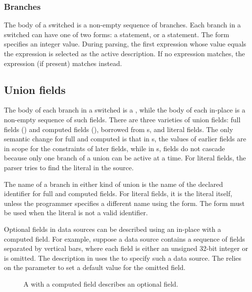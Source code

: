 \subsubsection{Branches}
The body of a switched \Punion{} is a non-empty sequence of branches.
Each branch in a switched \Punion{} can have one of two forms: a
\Pcase{} statement, or a \Pdefault{} statement.  The \Pcase{} form
specifies an integer value.  During parsing, the first \Pcase{}
expression whose value equals the \Pswitch{} expression is selected as
the active description. If no \Pcase{} expression
matches, the \Pdefault{} expression (if present) matches instead.

\subsection{Union fields}
The body of each branch in a switched \Punion{} is a ,
while the body of each in-place \Punion{} is a non-empty sequence of
such fields. 
There are three varieties of union fields: 
full fields () 
and computed fields (), borrowed from \Pstruct{}s, and 
literal fields.
The only semantic change for full and computed is that in \Pstruct{}s,
the values of earlier 
fields are in scope for the constraints of later fields, while in
\Punion{}s, fields do not cascade because only one branch of a union
can be active at a time.  For literal fields, the parser tries to find
the literal in the source.  

The name of a branch in either kind of union is the name of the
declared identifier for full and computed fields.  For literal fields,
it is the literal itself, unless the programmer specifies a different
name using the \Pfrom{} form.  The \Pfrom{} form must be used when the
literal is not a valid \C{} identifier.


Optional fields in data sources can be described using an in-place
\Punion{} with a computed field.  For example, suppose a data source
contains a sequence of fields separated by vertical bars, where each
field is either an unsigned 32-bit integer or is omitted.  The
description in  
uses the \Punion{}  to specify such a data source.
The  \Punion{} relies on the parameter  to set
a default value for the omitted field.

\begin{figure}

\caption{A \Punion{} with a computed field describes an optional field.}
\label{fig:union-option}
\end{figure}

